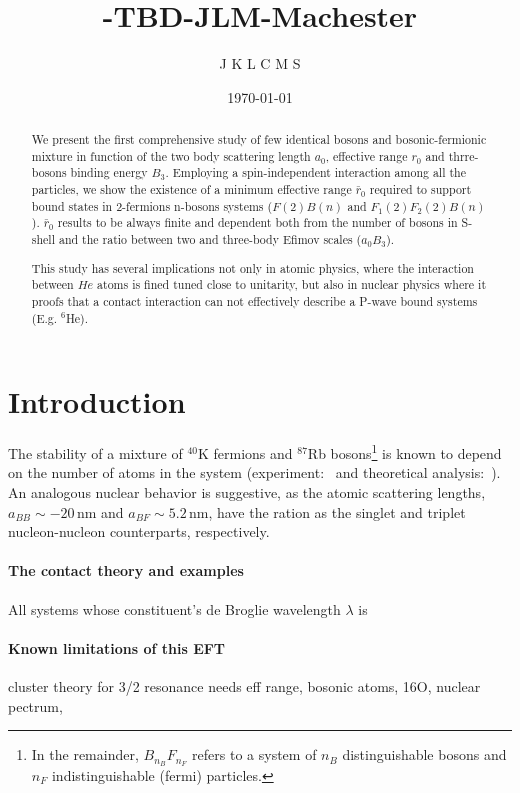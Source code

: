 \documentclass[aps,nofootinbib,prl,showpacs,twocolumn,groupedaddress,superscriptaddress]
{revtex4}
\begin{document}
\title{-TBD-} 


\title{JLM-Machester}
\author{J K L C M S}


\date{\today}

\begin{abstract}
We present the first comprehensive study of few identical bosons and bosonic-fermionic mixture in function of the two body scattering length $a_0$, effective range $r_0$ and thrre-bosons binding energy $B_3$.
Employing a spin-independent interaction among all the particles, we show the existence of a minimum effective range $\bar{r}_0$ required to support bound states in 2-fermions n-bosons systems ($F(2)B(n)$ and $F_1(2)F_2(2)B(n)$).
$\bar{r}_0$ results to be always finite and dependent both from the number of bosons in S-shell and the ratio between two and three-body Efimov scales ($a_0 B_3$).
 
This study has several implications not only in atomic physics, where the interaction between $He$ atoms is fined tuned close to unitarity, but also in nuclear physics where it proofs that a contact interaction can not effectively describe a P-wave bound systems (E.g. $^6$He).
\end{abstract}

\maketitle

\section{Introduction}

The stability of a mixture of ${}^{40}$K fermions and ${}^{87}$Rb bosons\footnote{In the remainder, $B_{n_B}F_{n_F}$ refers to a system of $n_B$ distinguishable
bosons and $n_F$ indistinguishable (fermi) particles.} is known to depend on the number of atoms in the system
(experiment:~\cite{Modugno2240} and theoretical analysis:~\cite{PhysRevA.68.043626}). An analogous nuclear behavior is suggestive, as the atomic
scattering lengths, $a_{BB}\sim-20\,$nm and $a_{BF}\sim 5.2\,$nm, have the ration as the singlet and triplet nucleon-nucleon counterparts, respectively.

\paragraph{The contact theory and examples}
All systems whose constituent's de Broglie wavelength $\lambda$ is
\paragraph{Known limitations of this EFT}
cluster theory for 3/2 resonance needs eff range,
bosonic atoms, 
16O, 
nuclear pectrum, 
\end{document}
